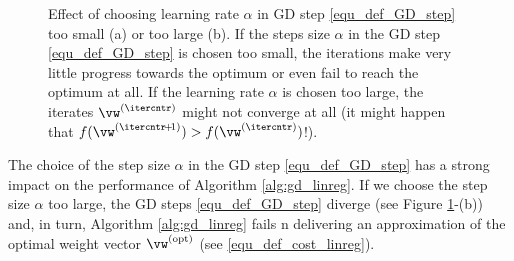\documentclass[12pt]{report}
\begin{document}
\begin{figure}[hbtp]
\begin{center}
\begin{minipage}{0.45\columnwidth}
\end{minipage}
\begin{minipage}{0.45\columnwidth}
\end{minipage}
\end{center}
\caption{Effect of choosing learning rate $\alpha$ in GD step 
	\eqref{equ_def_GD_step} too small (a) or too large (b). If the 
	steps size $\alpha$ in the GD step \eqref{equ_def_GD_step} is 
	chosen too small, the iterations make very little progress 
	towards the optimum or even fail to reach the optimum at all. 
	If the learning rate $\alpha$ is chosen too large, the iterates $\vw^{(\itercntr)}$ 
    might not converge at all (it might happen that $f(\vw^{(\itercntr\!+\!1)}) > f(\vw^{(\itercntr)})$!). }
\label{fig_small_large_alpha}
\end{figure}



The choice of the step size $\alpha$ in the GD step \eqref{equ_def_GD_step} 
has a strong impact on the performance of Algorithm \ref{alg:gd_linreg}. If we 
choose the step size $\alpha$ too large, the GD steps \eqref{equ_def_GD_step} 
diverge (see Figure \ref{fig_small_large_alpha}-(b)) and, in turn, 
Algorithm \ref{alg:gd_linreg} fails n delivering an approximation of 
the optimal weight vector $\vw^{(\rm opt)}$ (see \eqref{equ_def_cost_linreg}). 
\end{document}
